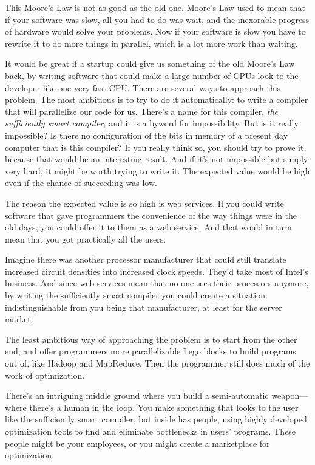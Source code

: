 This Moore's Law is not as good as the old one. Moore's Law used to mean
that if your software was slow, all you had to do was wait, and the
inexorable progress of hardware would solve your problems. Now if your
software is slow you have to rewrite it to do more things in parallel,
which is a lot more work than waiting.

It would be great if a startup could give us something of the old
Moore's Law back, by writing software that could make a large number of
CPUs look to the developer like one very fast CPU. There are several
ways to approach this problem. The most ambitious is to try to do it
automatically: to write a compiler that will parallelize our code for
us. There's a name for this compiler, \emph{the sufficiently smart
compiler,} and it is a byword for impossibility. But is it really
impossible? Is there no configuration of the bits in memory of a present
day computer that is this compiler? If you really think so, you should
try to prove it, because that would be an interesting result. And if
it's not impossible but simply very hard, it might be worth trying to
write it. The expected value would be high even if the chance of
succeeding was low.

The reason the expected value is so high is web services. If you could
write software that gave programmers the convenience of the way things
were in the old days, you could offer it to them as a web service. And
that would in turn mean that you got practically all the users.

Imagine there was another processor manufacturer that could still
translate increased circuit densities into increased clock speeds.
They'd take most of Intel's business. And since web services mean that
no one sees their processors anymore, by writing the sufficiently smart
compiler you could create a situation indistinguishable from you being
that manufacturer, at least for the server market.

The least ambitious way of approaching the problem is to start from the
other end, and offer programmers more parallelizable Lego blocks to
build programs out of, like Hadoop and MapReduce. Then the programmer
still does much of the work of optimization.

There's an intriguing middle ground where you build a semi-automatic
weapon---where there's a human in the loop. You make something that
looks to the user like the sufficiently smart compiler, but inside has
people, using highly developed optimization tools to find and eliminate
bottlenecks in users' programs. These people might be your employees, or
you might create a marketplace for optimization.

